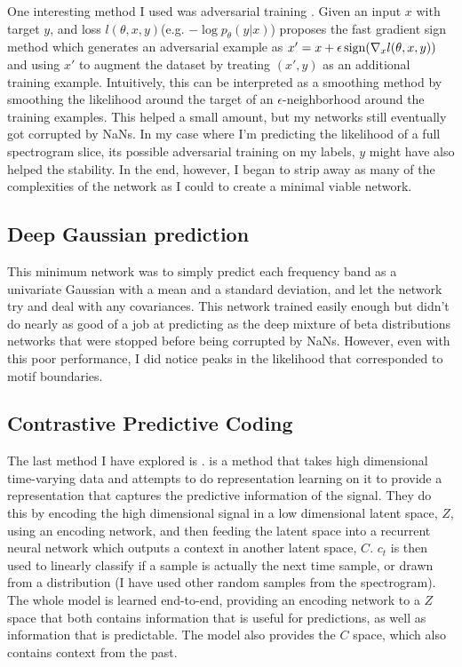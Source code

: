 One interesting method I used was adversarial training \cite{goodfellow2014explaining,lakshminarayanan2017simple}. Given an input $x$ with target $y$, and loss $l(\theta, x, y)$(e.g. $-\log p_\theta(y|x)$) \cite{goodfellow2014explaining} proposes the fast gradient sign method which generates an adversarial example as $x' = x + \epsilon \operatorname{sign}(\nabla_x l(\theta, x, y))$ and using $x'$ to augment the dataset by treating $(x', y)$ as an additional training example. Intuitively, this can be interpreted as a smoothing method by smoothing the likelihood around the target of an $\epsilon$-neighborhood around the training examples. This helped a small amount, but my networks still eventually got corrupted by NaNs. In my case where I'm predicting the likelihood of a full spectrogram slice, its possible adversarial training on my labels, $y$ might have also helped the stability. In the end, however, I began to strip away as many of the complexities of the network as I could to create a minimal viable network.

\subsection{Deep Gaussian prediction}
This minimum network was to simply predict each frequency band as a univariate Gaussian with a mean and a standard deviation, and let the network try and deal with any covariances. This network trained easily enough but didn't do nearly as good of a job at predicting as the deep mixture of beta distributions networks that were stopped before being corrupted by NaNs. However, even with this poor performance, I did notice peaks in the likelihood that corresponded to motif boundaries.

\subsection{Contrastive Predictive Coding}
The last method I have explored is \CPC\cite{CPC}. \CPC is a method that takes high dimensional time-varying data and attempts to do representation learning on it to provide a representation that captures the predictive information of the signal. They do this by encoding the high dimensional signal in a low dimensional latent space, $Z$, using an encoding network, and then feeding the latent space into a recurrent neural network which outputs a context in another latent space, $C$. $c_t$ is then used to linearly classify if a sample is actually the next time sample, or drawn from a distribution (I have used other random samples from the spectrogram). The whole model is learned end-to-end, providing an encoding network to a $Z$ space that both contains information that is useful for predictions, as well as information that is predictable. The model also provides the $C$ space, which also contains context from the past.

